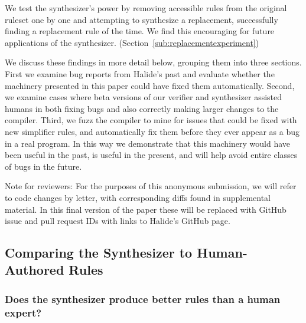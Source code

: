 \documentclass[acmsmall,review,anonymous]{acmart}\settopmatter{printfolios=true,printccs=false,printacmref=false}
\begin{document}
\begin{itemize}
  We test the synthesizer's power by removing \NumRulesInCorrectnessExperiment{} accessible rules from the original ruleset one by one and attempting to synthesize a replacement, successfully finding a replacement rule \PercentRulesResynthesized{} of the time.  We find this encouraging for future applications of the synthesizer. (Section~\ref{sub:replacementexperiment})
\end{itemize}

We discuss these findings in more detail below, grouping them into three sections. First we examine bug reports from Halide’s past and evaluate whether the machinery presented in this paper could have fixed them automatically. Second, we examine cases where beta versions of our verifier and synthesizer assisted humans in both fixing bugs and also correctly making larger changes to the compiler. Third, we fuzz the compiler to mine for issues that could be fixed with new simplifier rules, and automatically fix them before they ever appear as a bug in a real program. In this way we demonstrate that this machinery would have been useful in the past, is useful in the present, and will help avoid entire classes of bugs in the future.

Note for reviewers: For the purposes of this anonymous submission, we will refer to code changes by letter, with corresponding diffs found in supplemental material. In this final version of the paper these will be replaced with GitHub issue and pull request IDs with links to Halide’s GitHub page.

\subsection{Comparing the Synthesizer to Human-Authored Rules}

\subsubsection{Does the synthesizer produce better rules than a human expert?}
\label{sub:bugfixes}


\end{document}

